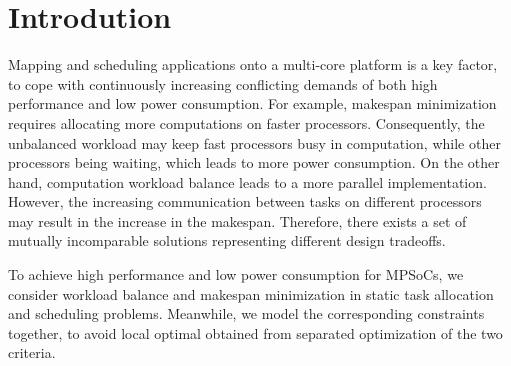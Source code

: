 \section{Introdution\label{se:intro}}
Mapping and scheduling applications onto a multi-core platform is a key factor, to cope with continuously
increasing conflicting demands of both high performance and low power consumption. %
For example, makespan minimization requires allocating more computations on faster processors. Consequently, the unbalanced workload may keep fast processors busy in computation, while other processors being waiting, which leads to more power consumption. On the other hand, computation workload balance leads to a more parallel implementation. However, the increasing communication between tasks on different processors may result in the increase in the makespan. Therefore, there exists a set of mutually incomparable solutions representing different design tradeoffs.

To achieve high performance and low power consumption for MPSoCs, we consider workload balance and makespan minimization in static task allocation and scheduling problems. Meanwhile, we model the corresponding constraints together, to avoid local optimal obtained from separated optimization of the two criteria.

